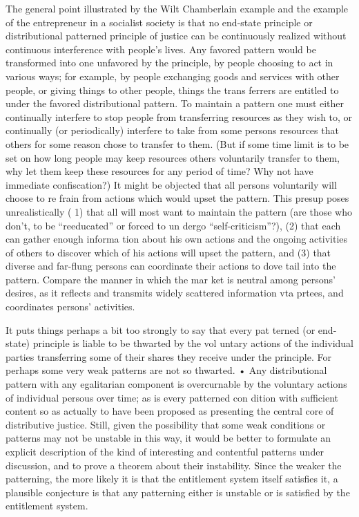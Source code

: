 \documentclass[11pt,openany]{book}
\begin{document}
The general point illustrated by the Wilt Chamberlain example and the example of the entrepreneur in a socialist society is that no end-state principle or distributional patterned principle of justice can be continuously realized without continuous interference with people's lives. Any favored pattern would be transformed into one unfavored by the principle, by people choosing to act in various ways; for example, by people exchanging goods and services with other people, or giving things to other people, things the trans ferrers are entitled to under the favored distributional pattern. To maintain a pattern one must either continually interfere to stop people from transferring resources as they wish to, or continually (or periodically) interfere to take from some persons resources that others for some reason chose to transfer to them. (But if some time limit is to be set on how long people may keep resources others voluntarily transfer to them, why let them keep these resources for any period of time? Why not have immediate confiscation?) It might be objected that all persons voluntarily will choose to re frain from actions which would upset the pattern. This presup poses unrealistically ( 1) that all will most want to maintain the pattern (are those who don't, to be ``reeducated'' or forced to un dergo ``self-criticism''?), (2) that each can gather enough informa tion about his own actions and the ongoing activities of others to discover which of his actions will upset the pattern, and (3) that diverse and far-flung persons can coordinate their actions to dove tail into the pattern. Compare the manner in which the mar ket is neutral among persons' desires, as it reflects and transmits widely scattered information vta prtees, and coordinates persons' activities. 

It puts things perhaps a bit too strongly to say that every pat terned (or end-state) principle is liable to be thwarted by the vol untary actions of the individual parties transferring some of their shares they receive under the principle. For perhaps some very weak patterns are not so thwarted. • Any distributional pattern with any egalitarian component is overcurnable by the voluntary actions of individual persous over time; as is every patterned con dition with sufficient content so as actually to have been proposed as presenting the central core of distributive justice. Still, given the possibility that some weak conditions or patterns may not be unstable in this way, it would be better to formulate an explicit description of the kind of interesting and contentful patterns under discussion, and to prove a theorem about their instability. Since the weaker the patterning, the more likely it is that the entitlement system itself satisfies it, a plausible conjecture is that any patterning either is unstable or is satisfied by the entitlement system. 
\end{document}
